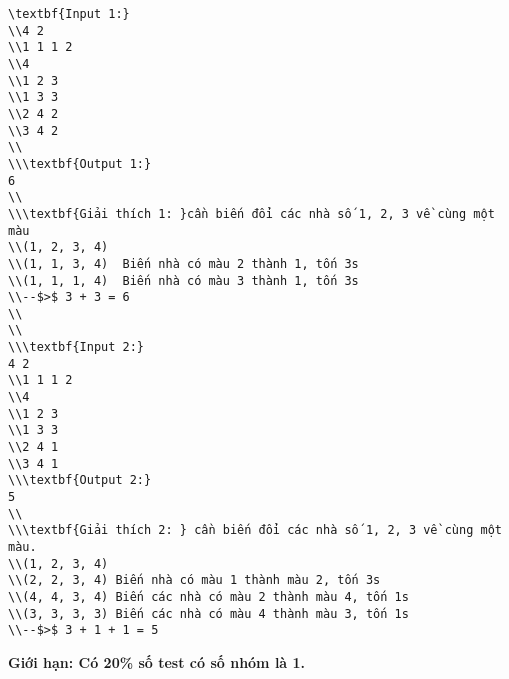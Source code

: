 \begin{verbatim}
\textbf{Input 1:}
\\4 2 
\\1 1 1 2
\\4
\\1 2 3
\\1 3 3
\\2 4 2
\\3 4 2
\\
\\\textbf{Output 1:}
6
\\
\\\textbf{Giải thích 1: }cần biến đổi các nhà số 1, 2, 3 về cùng một màu
\\(1, 2, 3, 4)
\\(1, 1, 3, 4)  Biến nhà có màu 2 thành 1, tốn 3s
\\(1, 1, 1, 4)  Biến nhà có màu 3 thành 1, tốn 3s
\\--$>$ 3 + 3 = 6
\\
\\
\\\textbf{Input 2:}
4 2 
\\1 1 1 2
\\4
\\1 2 3
\\1 3 3
\\2 4 1
\\3 4 1
\\\textbf{Output 2:}
5 
\\
\\\textbf{Giải thích 2: } cần biến đổi các nhà số 1, 2, 3 về cùng một màu.
\\(1, 2, 3, 4)
\\(2, 2, 3, 4) Biến nhà có màu 1 thành màu 2, tốn 3s
\\(4, 4, 3, 4) Biến các nhà có màu 2 thành màu 4, tốn 1s
\\(3, 3, 3, 3) Biến các nhà có màu 4 thành màu 3, tốn 1s
\\--$>$ 3 + 1 + 1 = 5\end{verbatim}

\textbf{      Giới hạn:\textbf{}     Có 20\% số test có số nhóm là 1.    }